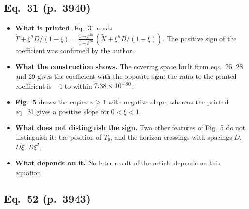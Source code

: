 \begin{table}[!tbp]
\centering\small

\caption{The operator against references that do not depend on Kim and Thorne. Ratios of the computed density to the reference. The thermal reference is the Stefan--Boltzmann law, checked against a numerical Bose integral; the image sum it is compared with comes from a derivation written out in the repository. The Unruh reference is \textsc{heuristic} because its source was not read.}
\label{tab:arbiters}
\end{table}

\subsection{Eq.~31 (p.~3940)}

\begin{itemize}
\item \textbf{What is printed.} Eq.~31 reads $\tilde T + \xi^n D/(1-\xi) = \frac{1+\xi^{2n}}{1-\xi^{2n}}\,(\tilde X + \xi^n D/(1-\xi))$. The positive sign of the coefficient was confirmed by the author.
\item \textbf{What the construction shows.} The covering space built from eqs.~25, 28 and 29 gives the coefficient with the opposite sign: the ratio to the printed coefficient is $-1$ to within $7.38\times10^{-80}$.
\item \textbf{Fig.~5} draws the copies $n \geq 1$ with negative slope, whereas the printed eq.~31 gives a positive slope for $0<\xi<1$.
\item \textbf{What does not distinguish the sign.} Two other features of Fig.~5 do not distinguish it: the position of $T_0$, and the horizon crossings with spacings $D$, $D\xi$, $D\xi^2$.
\item \textbf{What depends on it.} No later result of the article depends on this equation.
\end{itemize}

\subsection{Eq.~52 (p.~3943)}


